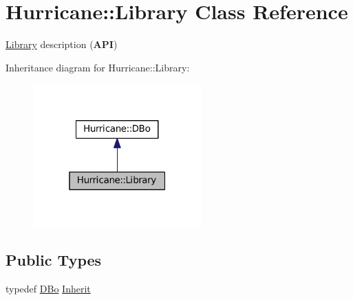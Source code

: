 \hypertarget{classHurricane_1_1Library}{}\section{Hurricane\+:\+:Library Class Reference}
\label{classHurricane_1_1Library}


\mbox{\hyperlink{classHurricane_1_1Library}{Library}} description ({\bfseries A\+PI})  




Inheritance diagram for Hurricane\+:\+:Library\+:\nopagebreak
\begin{figure}[H]
\begin{center}
\leavevmode
\includegraphics[width=184pt]{classHurricane_1_1Library__inherit__graph}
\end{center}
\end{figure}
\subsection*{Public Types}
\begin{DoxyCompactItemize}
\item 
typedef \mbox{\hyperlink{classHurricane_1_1DBo}{D\+Bo}} \mbox{\hyperlink{classHurricane_1_1Library_a30ef446b2da0d405bdf4e11ce67b160f}{Inherit}}
\end{DoxyCompactItemize}
